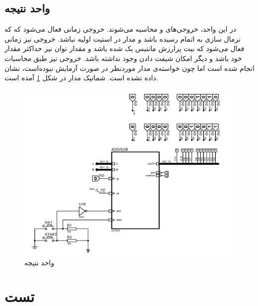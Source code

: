 \documentclass{article}
\begin{document}
\subsection{واحد نتیجه}
در این واحد، خروجی‌های  و  محاسبه می‌شوند.
خروجی  زمانی فعال می‌شود که که نرمال سازی به اتمام رسیده باشد و مدار در استیت اولیه نباشد.
خروجی  نیز زمانی فعال می‌شود که بیت پرارزش مانتیس یک شده باشد و مقدار توان نیز حداکثر مقدار خود باشد و دیگر امکان شیفت دادن وجود نداشته باشد.
خروجی  نیز طبق محاسبات انجام شده است اما چون خواسته‌ی مدار موردنظر در صورت آزمایش نبوده‌است، نشان داده نشده است. شماتیک مدار در شکل \ref{result} آمده است.

\begin{figure}
	\centering
	\includegraphics[scale=0.6, page=11]{./graphics/graphics}
	\caption{واحد نتیجه}
	\label{result}
\end{figure}

\section{تست}
\end{document}
